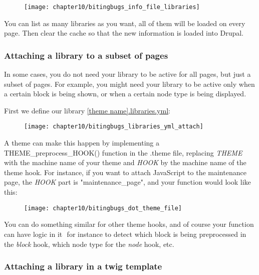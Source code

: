 \begin{figure}[H]
	\centering
	\texttt{[image: chapter10/bitingbugs\_info\_file\_libraries]}
	\label{fig:bitingbugs_info_file_libraries}
\end{figure}

You can list as many libraries as you want, all of them will be loaded on every page. Then clear the cache so that the new information is loaded into Drupal.

\subsubsection{Attaching a library to a subset of pages}

In some cases, you do not need your library to be active for all pages, but just a subset of pages. For example, you might need your library to be active only when a certain block is being shown, or when a certain node type is being displayed.

First we define our library \url{[theme name].libraries.yml}:



\begin{figure}[H]
	\centering
	\texttt{[image: chapter10/bitingbugs\_libraries\_yml\_attach]}
	\label{fig:bitingbugs_libraries_yml_attach}
\end{figure}

A theme can make this happen by implementing a THEME\_preprocess\_HOOK() function in the .theme file, replacing \textit{THEME} with the machine name of your theme and \textit{HOOK} by the machine name of the theme hook.
For instance, if you want to attach JavaScript to the maintenance page, the \textit{HOOK} part is "maintenance\_page", and your function would look like this:



\begin{figure}[H]
	\centering
	\texttt{[image: chapter10/bitingbugs\_dot\_theme\_file]}
	\label{fig:bitingbugs_dot_theme_file}
\end{figure}

You can do something similar for other theme hooks, and of course your function can have logic in it ­­ for instance to detect which block is being preprocessed in the \textit{block} hook, which node type for the \textit{node} hook, etc.


\subsubsection{Attaching a library in a twig template}

